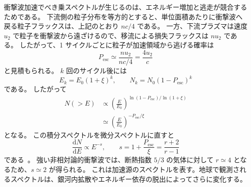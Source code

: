 \documentclass[book,paper=a4,fontsize=11pt]{jlreq}
\begin{document}
衝撃波加速でべき乗スペクトルが生じるのは、エネルギー増加と逃走が競合するためである。
下流側の粒子分布を等方的とすると、単位面積あたりに衝撃波へ戻る粒子フラックスは、上記のとおり \(nc/4\) である。
一方、下流プラズマは速度 \(u_2\) で粒子を衝撃波から遠ざけるので、移流による損失フラックスは \(nu_2\) である。
したがって、1 サイクルごとに粒子が加速領域から逃げる確率は
\begin{equation}
  P_{\mathrm{esc}}
  \simeq
  \frac{nu_2}{nc/4}
  =
  \frac{4u_2}{c}
\end{equation}
と見積もられる。
\(k\) 回のサイクル後には
\begin{equation}
  E_k=E_0(1+\xi)^k,
  \qquad
  N_k=N_0(1-P_{\mathrm{esc}})^k
\end{equation}
である。
したがって
\begin{align}
  N(>E)
  &\propto
  \left(\frac{E}{E_0}\right)^{
  \ln(1-P_{\mathrm{esc}})/\ln(1+\xi)}
  \\
  &\simeq
  \left(\frac{E}{E_0}\right)^{-P_{\mathrm{esc}}/\xi}
\end{align}
となる。
この積分スペクトルを微分スペクトルに直すと
\begin{equation}
  \frac{\mathrm{d}N}{\mathrm{d}E}
  \propto
  E^{-s},
  \qquad
  s
  =
  1+\frac{P_{\mathrm{esc}}}{\xi}
  =
  \frac{r+2}{r-1}
\end{equation}
である~\cite{BlandfordOstriker1978,Drury1983}。
強い非相対論的衝撃波では、断熱指数 \(5/3\) の気体に対して \(r\simeq4\) となるため、\(s\simeq2\) が得られる。
これは加速源のスペクトルを表す。地球で観測されるスペクトルは、銀河内拡散やエネルギー依存の脱出によってさらに変化する。
\end{document}
